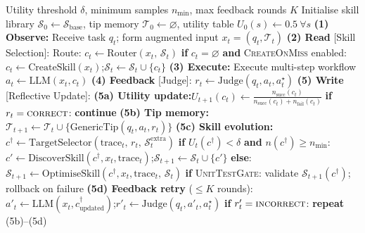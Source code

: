 \documentclass[11pt,a4paper]{article}
\begin{document}
  \begin{pseudobox}
  \begin{algorithmic}[1]
  \REQUIRE Utility threshold $\delta$, minimum samples $n_{\min}$, max feedback rounds $K$
  \STATE Initialise skill library $\mathcal{S}_0 \leftarrow \mathcal{S}_{\mathrm{base}}$, tip memory $\mathcal{T}_0 \leftarrow \varnothing$, utility
  table $U_0(s) \leftarrow 0.5\ \forall s$
    \STATE \textbf{(1) Observe:} Receive task $q_t$; form augmented input $x_t = (q_t, \mathcal{T}_t)$
    \STATE \textbf{(2) Read} \textcolor{trackR}{[Skill Selection]}:
    \STATE \quad Route: $c_t \leftarrow \mathrm{Router}(x_t,\, \mathcal{S}_t)$
    \STATE \quad \textbf{if} $c_t = \varnothing$ \textbf{and} \textsc{CreateOnMiss} enabled:
    \STATE \qquad $c_t \leftarrow \mathrm{CreateSkill}(x_t)$;\quad $\mathcal{S}_t \leftarrow \mathcal{S}_t \cup \{c_t\}$
    \STATE \textbf{(3) Execute:} Execute multi-step workflow $a_t \leftarrow \mathrm{LLM}(x_t, c_t)$
    \STATE \textbf{(4) Feedback} \textcolor{trackR}{[Judge]}:
    \STATE \quad $r_t \leftarrow \mathrm{Judge}(q_t, a_t, a^{\star}_t)$ 
    \STATE \textbf{(5) Write} \textcolor{trackP}{[Reflective Update]}:
    \STATE \quad \textbf{(5a) Utility update:}\quad $U_{t+1}(c_t) \leftarrow \frac{n_{\mathrm{succ}}(c_t)}{n_{\mathrm{succ}}(c_t) +
  n_{\mathrm{fail}}(c_t)}$
    \STATE \quad \textbf{if} $r_t = \textsc{correct}$: \textbf{continue}
    \STATE \quad \textbf{(5b) Tip memory:}\quad $\mathcal{T}_{t+1} \leftarrow \mathcal{T}_t \cup \{\mathrm{GenericTip}(q_t, a_t, r_t)\}$
    \STATE \quad \textbf{(5c) Skill evolution:}
    \STATE \quad\quad $c^{\dagger} \leftarrow \mathrm{TargetSelector}(\mathrm{trace}_t,\, r_t,\, \mathcal{S}_t^{\mathrm{extra}})$
    \STATE \quad\quad \textbf{if} $U_t(c^{\dagger}) < \delta$ \textbf{and} $n(c^{\dagger}) \geq n_{\min}$: 
    \STATE \qquad\quad $c' \leftarrow \mathrm{DiscoverSkill}(c^{\dagger}, x_t, \mathrm{trace}_t)$;\quad $\mathcal{S}_{t+1} \leftarrow \mathcal{S}_t
  \cup \{c'\}$
    \STATE \quad\quad \textbf{else}: 
    \STATE \qquad\quad $\mathcal{S}_{t+1} \leftarrow \mathrm{OptimiseSkill}(c^{\dagger}, x_t, \mathrm{trace}_t,\, \mathcal{S}_t)$
    \STATE \quad\quad \textbf{if} \textsc{UnitTestGate}: validate $\mathcal{S}_{t+1}(c^{\dagger})$; rollback on failure
    \STATE \quad \textbf{(5d) Feedback retry} ($\leq K$ rounds):
    \STATE \quad\quad $a'_t \leftarrow \mathrm{LLM}(x_t, c^{\dagger}_{\mathrm{updated}})$;\quad $r'_t \leftarrow \mathrm{Judge}(q_t, a'_t,
  a^{\star}_t)$
    \STATE \quad\quad \textbf{if} $r'_t = \textsc{incorrect}$: \textbf{repeat} (5b)--(5d)
  \ENDFOR
  \end{algorithmic}
  \end{pseudobox}
\end{document}
